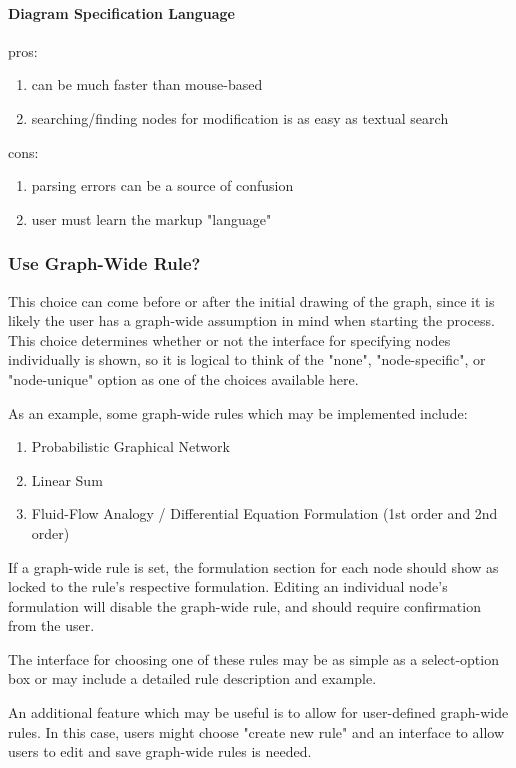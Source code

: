 \documentclass[conference]{IEEEtran}
\begin{document}
\paragraph{Diagram Specification Language}
pros:
\begin{enumerate}
 \item can be much faster than mouse-based
 \item searching/finding nodes for modification is as easy as textual search
\end{enumerate}

cons:
\begin{enumerate}
 \item parsing errors can be a source of confusion
 \item user must learn the markup "language"
\end{enumerate}

\subsubsection{Use Graph-Wide Rule?}
This choice can come before or after the initial drawing of the graph, since it is likely the user has a graph-wide assumption in mind when starting the process. 
This choice determines whether or not the interface for specifying nodes individually is shown, so it is logical to think of the "none", "node-specific", or "node-unique" option as one of the choices available here. 

As an example, some graph-wide rules which may be implemented include:
\begin{enumerate}
  \item Probabilistic Graphical Network
  \item Linear Sum
  \item Fluid-Flow Analogy / Differential Equation Formulation (1st order and 2nd order)
\end{enumerate}

If a graph-wide rule is set, the formulation section for each node should show as locked to the rule's respective formulation. 
Editing an individual node's formulation will disable the graph-wide rule, and should require confirmation from the user. 

The interface for choosing one of these rules may be as simple as a select-option box or may include a detailed rule description and example. 

An additional feature which may be useful is to allow for user-defined graph-wide rules. 
In this case, users might choose "create new rule" and an interface to allow users to edit and save graph-wide rules is needed.
\end{document}
